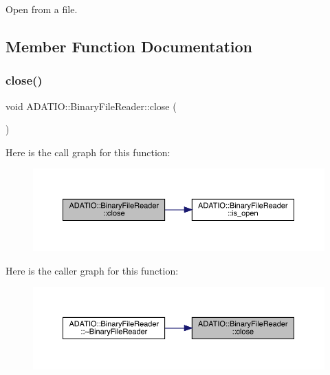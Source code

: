Open from a file. 



\subsection{Member Function Documentation}
\mbox{\label{classADATIO_1_1BinaryFileReader_af0501cb948e5220209226970867dbb26}} 
\subsubsection{\texorpdfstring{close()}{close()}\hspace{0.1cm}{\footnotesize\ttfamily [1/3]}}
{\footnotesize\ttfamily void A\+D\+A\+T\+I\+O\+::\+Binary\+File\+Reader\+::close (\begin{DoxyParamCaption}{ }\end{DoxyParamCaption})}

Here is the call graph for this function\+:
\nopagebreak
\begin{figure}[H]
\begin{center}
\leavevmode
\includegraphics[width=350pt]{df/d41/classADATIO_1_1BinaryFileReader_af0501cb948e5220209226970867dbb26_cgraph}
\end{center}
\end{figure}
Here is the caller graph for this function\+:
\nopagebreak
\begin{figure}[H]
\begin{center}
\leavevmode
\includegraphics[width=350pt]{df/d41/classADATIO_1_1BinaryFileReader_af0501cb948e5220209226970867dbb26_icgraph}
\end{center}
\end{figure}
\mbox{\label{classADATIO_1_1BinaryFileReader_af0501cb948e5220209226970867dbb26}} 
